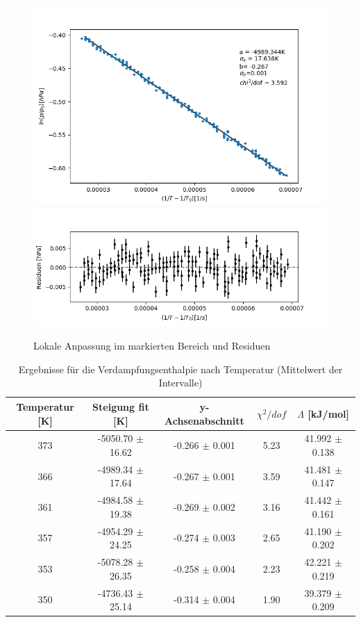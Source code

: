 \documentclass[12pt,a4paper]{article}
\begin{document}
\begin{figure}
\includegraphics[width=\linewidth]{Bilder/lokaler_fit_2A.png}
\includegraphics[width=\linewidth]{Bilder/lokale_Residuen_2A}
\caption[Lokale Anpassung]{Lokale Anpassung im markierten Bereich und Residuen}
\label{fig:fit_2A}
\end{figure}



\begin{table}
	\begin{tabular}{|c|c|c|c|c|}
		\hline
		\textbf{Temperatur [K]} & \textbf{Steigung fit [K]} & \textbf{y-Achsenabschnitt} & $\chi ^2/dof$ & \textbf{$\Lambda$ [kJ/mol]} \\
		\hline
		373 & -5050.70 $\pm$ 16.62 & -0.266 $\pm$ 0.001 & 5.23 & 41.992 $\pm$ 0.138 \\
		\hline
		366 & -4989.34 $\pm$ 17.64 & -0.267 $\pm$ 0.001 & 3.59 & 41.481 $\pm$ 0.147 \\
		\hline
		361 & -4984.58 $\pm$ 19.38 & -0.269 $\pm$ 0.002 & 3.16 & 41.442 $\pm$ 0.161 \\
		\hline
		357 & -4954.29 $\pm$ 24.25 & -0.274 $\pm$ 0.003 & 2.65 & 41.190 $\pm$ 0.202 \\
		\hline
		353 & -5078.28 $\pm$ 26.35 & -0.258 $\pm$ 0.004 & 2.23 & 42.221 $\pm$ 0.219 \\
		\hline
		350 & -4736.43 $\pm$ 25.14 & -0.314 $\pm$ 0.004 & 1.90 & 39.379 $\pm$ 0.209 \\
		\hline
	\end{tabular}
	\caption{Ergebnisse für die Verdampfungsenthalpie nach Temperatur (Mittelwert der Intervalle)}
	\label{tab:enthalpie_A}
\end{table}
\end{document}
